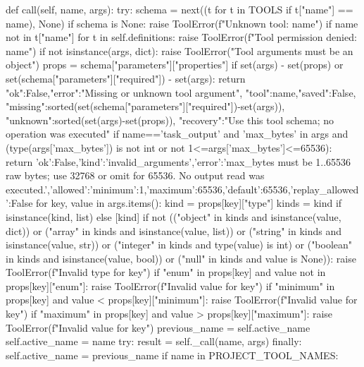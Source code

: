     def call(self, name, args):
        try:
            schema = next((t for t in TOOLS if t["name"] == name), None)
            if schema is None:
                raise ToolError(f"Unknown tool: {name}")
            if name not in {t["name"] for t in self.definitions}:
                raise ToolError(f"Tool permission denied: {name}")
            if not isinstance(args, dict):
                raise ToolError("Tool arguments must be an object")
            props = schema["parameters"]["properties"]
            if set(args) - set(props) or set(schema["parameters"]["required"]) - set(args):
                return {"ok":False,"error":"Missing or unknown tool argument",
                        "tool":name,"saved":False,
                        "missing":sorted(set(schema["parameters"]["required"])-set(args)),
                        "unknown":sorted(set(args)-set(props)),
                        "recovery":"Use this tool schema; no operation was executed"}
            if name=='task_output' and 'max_bytes' in args and (type(args['max_bytes']) is not int or not 1<=args['max_bytes']<=65536):
                return {'ok':False,'kind':'invalid_arguments','error':'max_bytes must be 1..65536 raw bytes; use 32768 or omit for 65536. No output read was executed.','allowed':{'minimum':1,'maximum':65536,'default':65536},'replay_allowed':False}
            for key, value in args.items():
                kind = props[key]["type"]
                kinds = kind if isinstance(kind, list) else [kind]
                if not (("object" in kinds and isinstance(value, dict)) or ("array" in kinds and isinstance(value, list)) or ("string" in kinds and isinstance(value, str)) or
                    ("integer" in kinds and type(value) is int) or
                    ("boolean" in kinds and isinstance(value, bool)) or ("null" in kinds and value is None)):
                    raise ToolError(f"Invalid type for {key}")
                if "enum" in props[key] and value not in props[key]["enum"]:
                    raise ToolError(f"Invalid value for {key}")
                if "minimum" in props[key] and value < props[key]["minimum"]:
                    raise ToolError(f"Invalid value for {key}")
                if "maximum" in props[key] and value > props[key]["maximum"]:
                    raise ToolError(f"Invalid value for {key}")
            previous_name = self.active_name
            self.active_name = name
            try:
                result = self._call(name, args)
            finally:
                self.active_name = previous_name
            if name in PROJECT_TOOL_NAMES:
